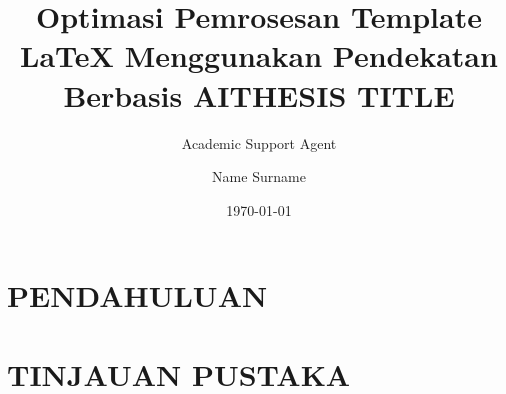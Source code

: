 \documentclass{report}
\title{Optimasi Pemrosesan Template LaTeX Menggunakan Pendekatan Berbasis AI}
\author{Academic Support Agent}
\date{\today}
\begin{document}
\maketitle

\begin{abstract}

\end{abstract}

\chapter{PENDAHULUAN}


\chapter{TINJAUAN PUSTAKA}


\usepackage{styles/fbe_tez}
\usepackage[utf8x]{inputenc} %
\renewcommand{\labelenumi}{(\roman{enumi})}
\usepackage{amsmath, amsthm, amssymb}
\usepackage[bottom]{footmisc}
\usepackage{cite}
\usepackage{graphicx}
\usepackage{longtable}
\graphicspath{{figures/}} %

\usepackage{multirow}
\usepackage{subfigure}
\usepackage{algorithm}
\usepackage{algorithmic}

\newtheorem{thm}{Theorem}[chapter]
\newtheorem{prop}[thm]{Proposition}
\newtheorem{lem}[thm]{Lemma}
\newtheorem{cor}[thm]{Corollary}
\title{THESIS TITLE}
\author{Name Surname}

\end{document}
